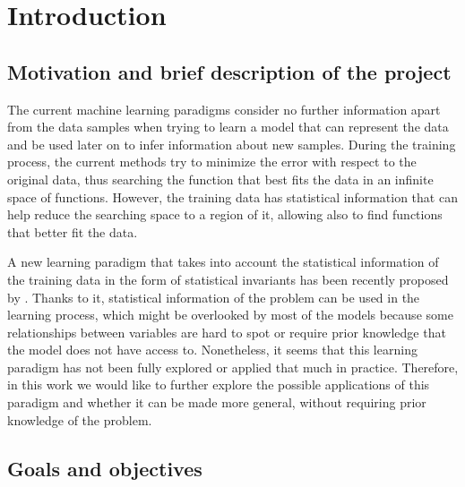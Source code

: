 
\chapter{Introduction}

\label{Chapter1}


\section{Motivation and brief description of the project}

The current machine learning paradigms consider no further information apart from the data
samples when trying to learn a model that can represent the data and be used later on
to infer information about new samples. During the training process, the current methods
try to minimize the error with respect to the original data, thus searching the function
that best fits the data in an infinite space of functions. However, the training data has
statistical information that can help reduce the searching space to a region of it, allowing
also to find functions that better fit the data.

A new learning paradigm that takes into account the statistical information of the training data
in the form of statistical invariants has been recently proposed by \cite{Vapnik2019}. Thanks to it,
statistical information of the problem can be used in the learning process, which might
be overlooked by most of the models because some relationships between variables are hard to
spot or require prior knowledge that the model does not have access to. Nonetheless,
it seems that this learning paradigm has not been fully explored or applied that much in practice.
Therefore, in this work we would like to further explore the possible applications of this
paradigm and whether it can be made more general, without requiring prior knowledge of the problem.


\section{Goals and objectives}

